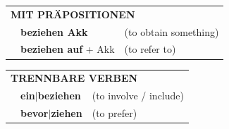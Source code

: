 \documentclass[10pt,a4paper]{revtex4-2}
\begin{document}
\begin{verbbox-acc}
\vspace{10pt}

\begin{tabular}{lll}
\multicolumn{3}{l}{\textbf{MIT PRÄPOSITIONEN}}\\
& \textbf{beziehen Akk} & (to obtain something)\\
& \textbf{beziehen auf} + Akk & (to refer to)\\
\end{tabular}
\hfill
\begin{tabular}{lll}
\multicolumn{3}{l}{\textbf{TRENNBARE VERBEN}}\\
& \textbf{ein$|$beziehen} & (to involve / include)\\
& \textbf{bevor$|$ziehen} & (to prefer)\\
\end{tabular}

\vspace{-5pt}
\end{verbbox-acc}
\end{document}
